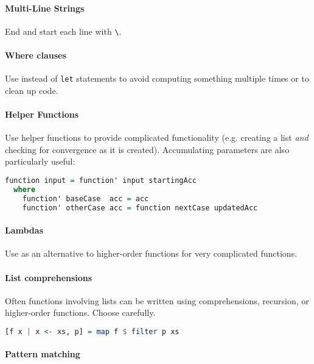\documentclass[twocolumn,english]{article}
\begin{document}
\paragraph{Multi-Line Strings}

End and start each line with \texttt{\textbackslash{}}.


\paragraph{Where clauses}

Use instead of \texttt{let} statements to avoid computing something
multiple times or to clean up code.


\paragraph{Helper Functions}

Use helper functions to provide complicated functionality (e.g. creating
a list \emph{and} checking for convergence as it is created). Accumulating
parameters are also particularly useful:

\begin{lstlisting}[language=Haskell,frame=single]
function input = function' input startingAcc
  where
    function' baseCase  acc = acc
    function' otherCase acc = function nextCase updatedAcc
\end{lstlisting}



\paragraph{Lambdas}

Use as an alternative to higher-order functions for very complicated
functions.


\paragraph*{List comprehensions}

Often functions involving lists can be written using comprehensions,
recursion, or higher-order functions. Choose carefully.

\begin{lstlisting}[language=Haskell,frame=single]
[f x | x <- xs, p] = map f $ filter p xs
\end{lstlisting}



\paragraph{Pattern matching}
\end{document}
